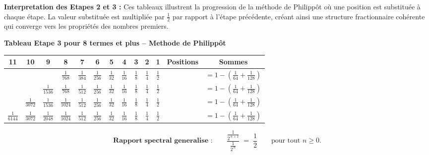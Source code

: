 \documentclass[a4paper,11pt]{article}
\newenvironment{resume}{%
    \begin{tcolorbox}[colback=purple!5,colframe=holpurple,title={\textbf{Résumé visuel}}]
}{%
    \end{tcolorbox}
}
\begin{document}
\begin{resume}
\textbf{Interpretation des Etapes 2 et 3 :} Ces tableaux illustrent la progression de la méthode de Philippôt où une position est substituée à chaque étape. La valeur substituée est multipliée par $\frac{1}{2}$ par rapport à l'étape précédente, créant ainsi une structure fractionnaire cohérente qui converge vers les propriétés des nombres premiers.
\end{resume}

\begin{center}
\textbf{Tableau Etape 3 pour 8 termes et plus -- Methode de Philippôt}
\end{center}

\begin{center}
\scriptsize
\begin{tabular}{|c|c|c|c|c|c|c|c|c|c|c|c|c|}
\hline
11 & 10 & 9 & 8 & 7 & 6 & 5 & 4 & 3 & 2 & 1 & \textbf{Positions} & \textbf{Sommes} \\
\hline
 &  &  & $\frac{1}{768}$ & $\frac{1}{384}$ & $\frac{1}{256}$ & $\frac{1}{32}$ & $\frac{1}{16}$ & $\frac{1}{8}$ & $\frac{1}{4}$ & $\frac{1}{2}$ &  & $= 1 - \left(\frac{1}{64} + \frac{1}{128}\right)$ \\
\hline
 &  & $\frac{1}{1536}$ & $\frac{1}{768}$ & $\frac{1}{512}$ & $\frac{1}{256}$ & $\frac{1}{32}$ & $\frac{1}{16}$ & $\frac{1}{8}$ & $\frac{1}{4}$ & $\frac{1}{2}$ &  & $= 1 - \left(\frac{1}{64} + \frac{1}{128}\right)$ \\
\hline
 & $\frac{1}{3072}$ & $\frac{1}{1536}$ & $\frac{1}{1024}$ & $\frac{1}{512}$ & $\frac{1}{256}$ & $\frac{1}{32}$ & $\frac{1}{16}$ & $\frac{1}{8}$ & $\frac{1}{4}$ & $\frac{1}{2}$ &  & $= 1 - \left(\frac{1}{64} + \frac{1}{128}\right)$ \\
\hline
$\frac{1}{6144}$ & $\frac{1}{3072}$ & $\frac{1}{2048}$ & $\frac{1}{1024}$ & $\frac{1}{512}$ & $\frac{1}{256}$ & $\frac{1}{32}$ & $\frac{1}{16}$ & $\frac{1}{8}$ & $\frac{1}{4}$ & $\frac{1}{2}$ &  & $= 1 - \left(\frac{1}{64} + \frac{1}{128}\right)$ \\
\hline
\end{tabular}
\end{center}


\[
\textbf{Rapport spectral generalise :}\qquad
\frac{\displaystyle \frac{1}{2^{\,n+1}}}{\displaystyle \frac{1}{2^{\,n}}}
\;=\;
\frac{1}{2}
\qquad\text{pour tout } n \ge 0.
\]
\end{document}
